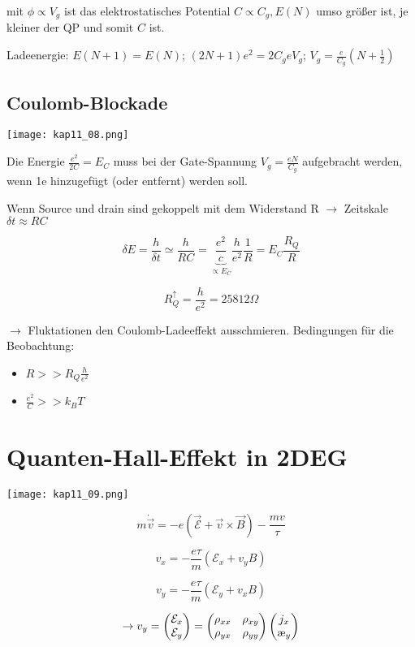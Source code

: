 mit \(\phi\propto V_g\) ist das elektrostatisches Potential
\(C\propto C_g, E(N)\) umso größer ist, je kleiner der QP und somit \(C\) ist.

Ladeenergie: \(E(N+1) = E(N)\); \((2N+1)e^2 = 2C_g eV_g\); \(V_g = \frac{e}{C_g}(N+\frac{1}{2})\)



\subsection{Coulomb-Blockade}

\texttt{[image: kap11\_08.png]}

Die Energie \(\frac{e^2}{2C}=E_C\) muss bei der Gate-Spannung \(V_g = \frac{eN}{C_g}\) aufgebracht werden, wenn 1e hinzugefügt (oder entfernt) werden soll.

Wenn Source und drain sind gekoppelt mit dem Widerstand R \(\rightarrow \) Zeitskale \(\delta t \approx RC\)

\[\delta E = \frac{h}{\delta t} \simeq \frac{h}{RC} = \underbrace{\frac{e^2}{c}}_{\propto E_C}\frac{h}{e^2}\frac{1}{R} = E_C\frac{R_Q}{R}\]

\[R^\uparrow_Q = \frac{h}{e^2}=25812\Omega\]

\(\rightarrow \) Fluktationen den Coulomb-Ladeeffekt ausschmieren. Bedingungen für die Beobachtung:

\begin{itemize}
\item \(R>>R_Q\frac{h}{e^2}\)
\item \(\frac{e^2}{C}>>k_BT\)
\end{itemize}


\section{Quanten-Hall-Effekt in 2DEG}

\texttt{[image: kap11\_09.png]}

\[m \dot{\vec v} = -e(\vec{ \mathcal E} + \vec v\times\vec B)-\frac{mv}{\tau}\]

\[v_x = -\frac{e\tau}{m}(\mathcal E_x + v_yB)\]

\[v_y = -\frac{e\tau}{m}(\mathcal E_y + v_xB)\]

\[\rightarrow v_y = \begin{pmatrix}\mathcal E_x\\\mathcal E_y\end{pmatrix} =\begin{pmatrix}\rho_{xx}&\rho_{xy}\\\rho_{yx}&\rho_{yy}\end{pmatrix}\begin{pmatrix}j_x\\\j_y\end{pmatrix} \]

